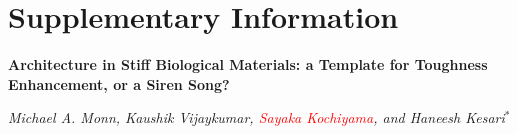 \documentclass[12pt,onecolumn]{article}
\begin{document}

\doublespacing
\clearpage
\pagebreak
\onecolumn

\setcounter{page}{1}

\setcounter{section}{0}
\renewcommand{\thesection}{S\arabic{section}}

\setcounter{equation}{0}
\renewcommand{\theequation}{S\arabic{equation}}

\setcounter{figure}{0}
\renewcommand{\thefigure}{S\arabic{figure}}
\setcounter{table}{0}
\renewcommand{\thetable}{S\arabic{table}}

\part*{Supplementary Information}

\textbf{Architecture in Stiff Biological Materials: a Template for Toughness Enhancement, or a Siren Song?}

\textit{Michael A. Monn, Kaushik Vijaykumar, \textcolor{red}{Sayaka Kochiyama}, and Haneesh Kesari$^*$}
\end{document}
